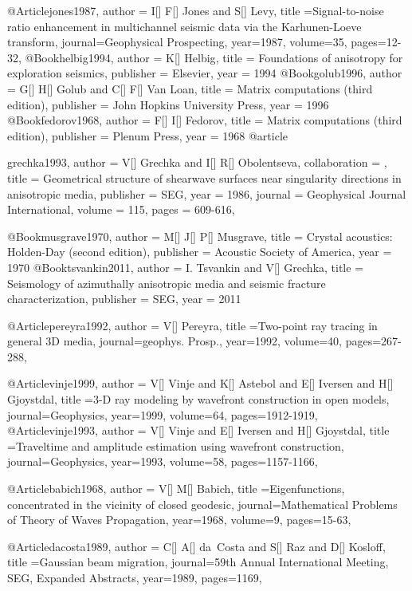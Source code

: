 {@Article{jones1987,
  author = {I[] F[] Jones and S[] Levy},
  title ={Signal-to-noise ratio enhancement in multichannel seismic data via the Karhunen-Loeve transform},
  journal={Geophysical Prospecting},
  year=1987,
  volume=35,
  pages={12-32},
}
@Book{helbig1994,
  author =	 {K[] Helbig},
  title =	 {Foundations of anisotropy for exploration seismics},
  publisher =	 {Elsevier},
  year =	 1994
}
@Book{golub1996,
  author =	 {G[] H[] Golub and C[] F[] Van Loan},
  title =	 {Matrix computations (third edition)},
  publisher =	 {John Hopkins University Press},
  year =	 1996
}
@Book{fedorov1968,
  author =	 {F[] I[] Fedorov},
  title =	 {Matrix computations (third edition)},
  publisher =	 {Plenum Press},
  year =	 1968
}
@article{grechka1993,
author = {V[] Grechka and I[] R[] Obolentseva},
collaboration = {},
title = {Geometrical structure of shearwave
surfaces near singularity directions in anisotropic media},
publisher = {SEG},
year = {1986},
journal = {Geophysical Journal International},
volume = {115},
pages = {609-616},

}

@Book{musgrave1970,
  author =	 {M[] J[] P[] Musgrave},
  title =	 {Crystal acoustics: Holden-Day (second edition)},
  publisher =	 {Acoustic Society of America},
  year =	 1970
}
@Book{tsvankin2011,
  author =	 {I. Tsvankin and V[] Grechka},
  title =	 {Seismology of azimuthally anisotropic media and seismic fracture characterization},
  publisher =	 {SEG},
  year =	 2011
}

@Article{pereyra1992,
  author = {V[] Pereyra},
  title ={Two-point ray tracing in general 3{D} media},
  journal={geophys. Prosp.},
  year=1992,
  volume=40,
  pages={267-288},
}


@Article{vinje1999,
  author = {V[] Vinje and K[] Astebol and E[] Iversen and H[] Gjoystdal},
  title ={3-D ray modeling by wavefront construction in open models},
  journal={Geophysics},
  year=1999,
  volume=64,
  pages={1912-1919},
}
@Article{vinje1993,
  author = {V[] Vinje and E[] Iversen and H[] Gjoystdal},
  title ={Traveltime and amplitude estimation using wavefront construction},
  journal={Geophysics},
  year=1993,
  volume=58,
  pages={1157-1166},
}


@Article{babich1968,
  author = {V[] M[] Babich},
  title ={Eigenfunctions, concentrated in the vicinity of closed geodesic},
  journal={Mathematical Problems of Theory of Waves Propagation},
  year=1968,
  volume=9,
  pages={15-63},
}

@Article{dacosta1989,
  author = {C[] A[] da~Costa and S[] Raz and D[] Kosloff},
  title ={Gaussian beam migration},
  journal={59th Annual International Meeting, SEG, Expanded Abstracts},
  year=1989,
  pages={1169},
}

}
